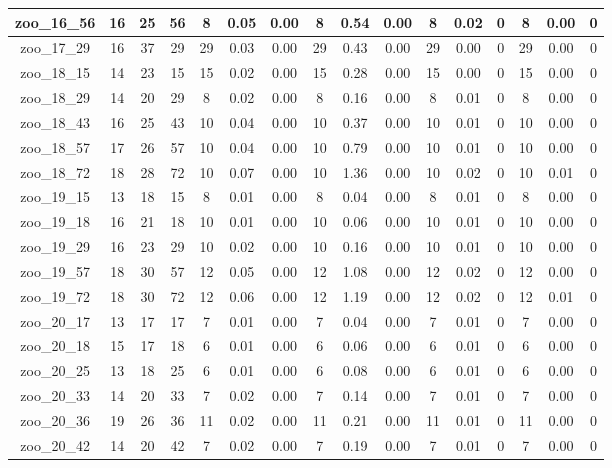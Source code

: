 \begin{landscape}
\begin{longtable}{|c|c|c|c|c|c|c|c|c|c|c|c|c|c|c|c|}
zoo\_16\_56 & 16 & 25 & 56 & 8 & 0.05 & 0.00 & 8 & 0.54 & 0.00 & 8 & 0.02 & 0 & 8 & 0.00 & 0 \\ \hline 
zoo\_17\_29 & 16 & 37 & 29 & 29 & 0.03 & 0.00 & 29 & 0.43 & 0.00 & 29 & 0.00 & 0 & 29 & 0.00 & 0 \\ \hline 
zoo\_18\_15 & 14 & 23 & 15 & 15 & 0.02 & 0.00 & 15 & 0.28 & 0.00 & 15 & 0.00 & 0 & 15 & 0.00 & 0 \\ \hline 
zoo\_18\_29 & 14 & 20 & 29 & 8 & 0.02 & 0.00 & 8 & 0.16 & 0.00 & 8 & 0.01 & 0 & 8 & 0.00 & 0 \\ \hline 
zoo\_18\_43 & 16 & 25 & 43 & 10 & 0.04 & 0.00 & 10 & 0.37 & 0.00 & 10 & 0.01 & 0 & 10 & 0.00 & 0 \\ \hline 
zoo\_18\_57 & 17 & 26 & 57 & 10 & 0.04 & 0.00 & 10 & 0.79 & 0.00 & 10 & 0.01 & 0 & 10 & 0.00 & 0 \\ \hline 
zoo\_18\_72 & 18 & 28 & 72 & 10 & 0.07 & 0.00 & 10 & 1.36 & 0.00 & 10 & 0.02 & 0 & 10 & 0.01 & 0 \\ \hline 
zoo\_19\_15 & 13 & 18 & 15 & 8 & 0.01 & 0.00 & 8 & 0.04 & 0.00 & 8 & 0.01 & 0 & 8 & 0.00 & 0 \\ \hline 
zoo\_19\_18 & 16 & 21 & 18 & 10 & 0.01 & 0.00 & 10 & 0.06 & 0.00 & 10 & 0.01 & 0 & 10 & 0.00 & 0 \\ \hline 
zoo\_19\_29 & 16 & 23 & 29 & 10 & 0.02 & 0.00 & 10 & 0.16 & 0.00 & 10 & 0.01 & 0 & 10 & 0.00 & 0 \\ \hline 
zoo\_19\_57 & 18 & 30 & 57 & 12 & 0.05 & 0.00 & 12 & 1.08 & 0.00 & 12 & 0.02 & 0 & 12 & 0.00 & 0 \\ \hline 
zoo\_19\_72 & 18 & 30 & 72 & 12 & 0.06 & 0.00 & 12 & 1.19 & 0.00 & 12 & 0.02 & 0 & 12 & 0.01 & 0 \\ \hline 
zoo\_20\_17 & 13 & 17 & 17 & 7 & 0.01 & 0.00 & 7 & 0.04 & 0.00 & 7 & 0.01 & 0 & 7 & 0.00 & 0 \\ \hline 
zoo\_20\_18 & 15 & 17 & 18 & 6 & 0.01 & 0.00 & 6 & 0.06 & 0.00 & 6 & 0.01 & 0 & 6 & 0.00 & 0 \\ \hline 
zoo\_20\_25 & 13 & 18 & 25 & 6 & 0.01 & 0.00 & 6 & 0.08 & 0.00 & 6 & 0.01 & 0 & 6 & 0.00 & 0 \\ \hline 
zoo\_20\_33 & 14 & 20 & 33 & 7 & 0.02 & 0.00 & 7 & 0.14 & 0.00 & 7 & 0.01 & 0 & 7 & 0.00 & 0 \\ \hline 
zoo\_20\_36 & 19 & 26 & 36 & 11 & 0.02 & 0.00 & 11 & 0.21 & 0.00 & 11 & 0.01 & 0 & 11 & 0.00 & 0 \\ \hline 
zoo\_20\_42 & 14 & 20 & 42 & 7 & 0.02 & 0.00 & 7 & 0.19 & 0.00 & 7 & 0.01 & 0 & 7 & 0.00 & 0 \\ \hline 

\end{longtable}
\end{landscape}
